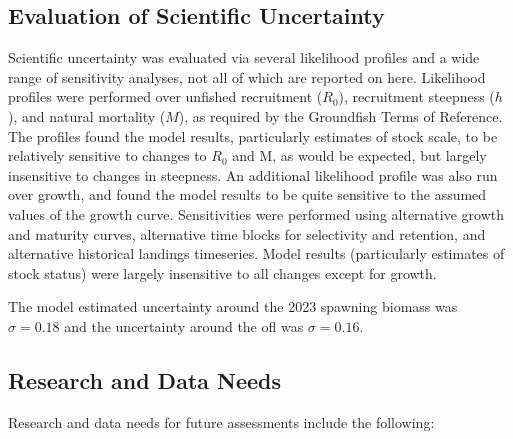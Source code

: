 \documentclass[11pt,
  english,
  letterpaper,
]{article}
\begin{document}
\hypertarget{evaluation-of-scientific-uncertainty}{%
\subsection{Evaluation of Scientific Uncertainty}\label{evaluation-of-scientific-uncertainty}}

Scientific uncertainty was evaluated via several likelihood profiles and a wide range of sensitivity analyses, not all of which are reported on here. Likelihood profiles were performed over unfished recruitment (\(R_0\)), recruitment steepness (\(h\)), and natural mortality (\(M\)), as required by the Groundfish Terms of Reference. The profiles found the model results, particularly estimates of stock scale, to be relatively sensitive to changes to \(R_0\) and M, as would be expected, but largely insensitive to changes in steepness. An additional likelihood profile was also run over growth, and found the model results to be quite sensitive to the assumed values of the growth curve. Sensitivities were performed using alternative growth and maturity curves, alternative time blocks for selectivity and retention, and alternative historical landings timeseries. Model results (particularly estimates of stock status) were largely insensitive to all changes except for growth.

The model estimated uncertainty around the 2023 spawning biomass was \(\sigma = 0.18\) and the uncertainty around the \gls{ofl} was \(\sigma = 0.16\).

\hypertarget{research-and-data-needs-1}{%
\subsection{Research and Data Needs}\label{research-and-data-needs-1}}

Research and data needs for future assessments include the following:
\end{document}
